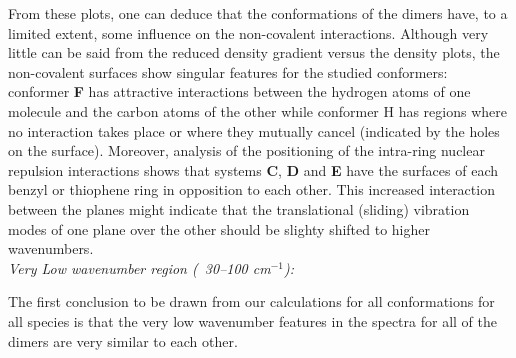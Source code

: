 		From these plots, one can deduce that the conformations of the dimers have, to a limited extent, some influence on the non-covalent interactions. Although very little can be said from the reduced density gradient versus the density plots, the non-covalent surfaces show singular features for the studied conformers: conformer \textbf{F} has attractive interactions between the hydrogen atoms of one molecule and the carbon atoms of the other while conformer H has regions where no interaction takes place or where they mutually cancel (indicated by the holes on the surface). Moreover, analysis of the positioning of the intra-ring nuclear repulsion interactions shows that systems \textbf{C}, \textbf{D} and \textbf{E} have the surfaces of each benzyl or thiophene ring in opposition to each other. This increased interaction between the planes might indicate that the translational (sliding) vibration modes of one plane over the other should be slighty shifted to higher wavenumbers.\\
		
		\textit{Very Low wavenumber region (~30–100 cm$^{-1}$):}
		
		The first conclusion to be drawn from our calculations for all conformations for all species is that the very low wavenumber features in the spectra for all of the dimers are very similar to each other.\\
		
